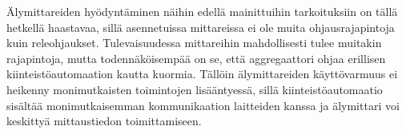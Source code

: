   Älymittareiden hyödyntäminen näihin edellä mainittuihin tarkoituksiin on tällä hetkellä haastavaa, sillä asennetuissa mittareissa ei ole muita ohjausrajapintoja kuin releohjaukset. Tulevaisuudessa mittareihin mahdollisesti tulee muitakin rajapintoja, mutta todennäköisempää on se, että aggregaattori ohjaa erillisen kiinteistöautomaation kautta kuormia. Tällöin älymittareiden käyttövarmuus ei heikenny monimutkaisten toimintojen lisääntyessä, sillä kiinteistöautomaatio sisältää monimutkaisemman kommunikaation laitteiden kanssa ja älymittari voi keskittyä mittaustiedon toimittamiseen.
